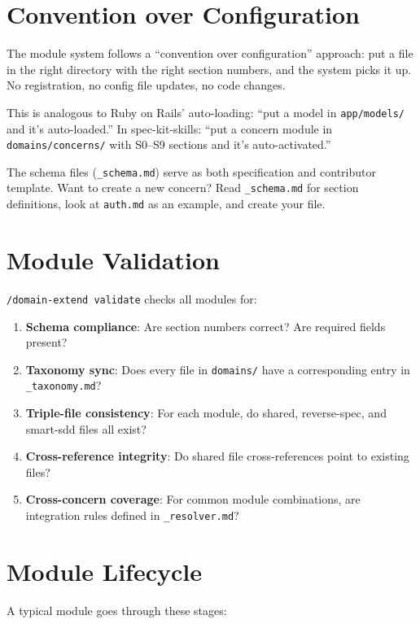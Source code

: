 \documentclass[11pt,a4paper,openright,twoside]{report}
\newcommand{\cmd}[1]{\texttt{/#1}}
\newcommand{\file}[1]{\texttt{#1}}
\begin{document}
\section{Convention over Configuration}

The module system follows a ``convention over configuration'' approach: put a file in the right directory with the right section numbers, and the system picks it up. No registration, no config file updates, no code changes.

This is analogous to Ruby on Rails' auto-loading: ``put a model in \file{app/models/} and it's auto-loaded.'' In spec-kit-skills: ``put a concern module in \file{domains/concerns/} with S0--S9 sections and it's auto-activated.''

The schema files (\file{\_schema.md}) serve as both specification and contributor template. Want to create a new concern? Read \file{\_schema.md} for section definitions, look at \file{auth.md} as an example, and create your file.

\section{Module Validation}

\cmd{domain-extend validate} checks all modules for:

\begin{enumerate}
  \item \textbf{Schema compliance}: Are section numbers correct? Are required fields present?
  \item \textbf{Taxonomy sync}: Does every file in \file{domains/} have a corresponding entry in \file{\_taxonomy.md}?
  \item \textbf{Triple-file consistency}: For each module, do shared, reverse-spec, and smart-sdd files all exist?
  \item \textbf{Cross-reference integrity}: Do shared file cross-references point to existing files?
  \item \textbf{Cross-concern coverage}: For common module combinations, are integration rules defined in \file{\_resolver.md}?
\end{enumerate}

\section{Module Lifecycle}

A typical module goes through these stages:
\end{document}
